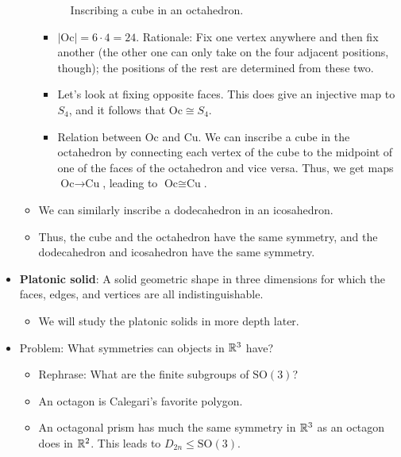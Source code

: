 \documentclass[../notes.tex]{subfiles}
\begin{document}
\begin{itemize}
\begin{itemize}
\begin{figure}[h!]
            \caption{Inscribing a cube in an octahedron.}
            \label{fig:CuOh}
        \end{figure}
        \begin{itemize}
            \item $|\text{Oc}|=6\cdot 4=24$. Rationale: Fix one vertex anywhere and then fix another (the other one can only take on the four adjacent positions, though); the positions of the rest are determined from these two.
            \item Let's look at fixing opposite faces. This does give an injective map to $S_4$, and it follows that $\text{Oc}\cong S_4$.
            \item Relation between $\text{Oc}$ and $\text{Cu}$. We can inscribe a cube in the octahedron by connecting each vertex of the cube to the midpoint of one of the faces of the octahedron and vice versa. Thus, we get maps $\text{Oc}\to\text{Cu}$, leading to $\text{Oc}\cong\text{Cu}$.
        \end{itemize}
        \item We can similarly inscribe a dodecahedron in an icosahedron.
        \item Thus, the cube and the octahedron have the same symmetry, and the dodecahedron and icosahedron have the same symmetry.
    \end{itemize}
    \item \textbf{Platonic solid}: A solid geometric shape in three dimensions for which the faces, edges, and vertices are all indistinguishable.
    \begin{itemize}
        \item We will study the platonic solids in more depth later.
    \end{itemize}
    \item Problem: What symmetries can objects in $\mathbb{R}^3$ have?
    \begin{itemize}
        \item Rephrase: What are the finite subgroups of $\text{SO}(3)$?
        \item An octagon is Calegari's favorite polygon.
        \item An octagonal prism has much the same symmetry in $\mathbb{R}^3$ as an octagon does in $\mathbb{R}^2$. This leads to $D_{2n}\leq\text{SO}(3)$.

\end{itemize}
\end{itemize}
\end{document}
